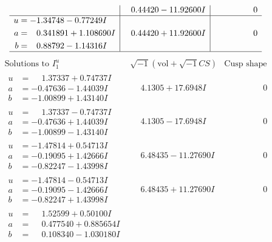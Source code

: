 \documentclass[1p]{elsarticle_modified}
\theoremstyle{definition}
\newcommand{\I}{\sqrt{-1}}
\begin{document}
$$\begin{array}{c|c|c}
 & \phantom{-}0.44420 - 11.92600 I & \phantom{-0.000000 } 0 \\ \hline\begin{aligned}
u &= -1.34748 - 0.77249 I \\
a &= \phantom{-}0.341891 + 1.108690 I \\
b &= \phantom{-}0.88792 - 1.14316 I\end{aligned}
 & \phantom{-}0.44420 + 11.92600 I & \phantom{-0.000000 } 0\\
 \hline 
 \end{array}$$\newpage$$\begin{array}{c|c|c}  
\text{Solutions to }I^u_{1}& \I (\text{vol} + \sqrt{-1}CS) & \text{Cusp shape}\\
 \hline 
\begin{aligned}
u &= \phantom{-}1.37337 + 0.74737 I \\
a &= -0.47636 - 1.44039 I \\
b &= -1.00899 + 1.43140 I\end{aligned}
 & \phantom{-}4.1305 + 17.6948 I & \phantom{-0.000000 } 0 \\ \hline\begin{aligned}
u &= \phantom{-}1.37337 - 0.74737 I \\
a &= -0.47636 + 1.44039 I \\
b &= -1.00899 - 1.43140 I\end{aligned}
 & \phantom{-}4.1305 - 17.6948 I & \phantom{-0.000000 } 0 \\ \hline\begin{aligned}
u &= -1.47814 + 0.54713 I \\
a &= -0.19095 + 1.42666 I \\
b &= -0.82247 - 1.43998 I\end{aligned}
 & \phantom{-}6.48435 - 11.27690 I & \phantom{-0.000000 } 0 \\ \hline\begin{aligned}
u &= -1.47814 - 0.54713 I \\
a &= -0.19095 - 1.42666 I \\
b &= -0.82247 + 1.43998 I\end{aligned}
 & \phantom{-}6.48435 + 11.27690 I & \phantom{-0.000000 } 0 \\ \hline\begin{aligned}
u &= \phantom{-}1.52599 + 0.50100 I \\
a &= \phantom{-}0.477540 + 0.885654 I \\
b &= \phantom{-}0.108340 - 1.030180 I\end{aligned}

\end{array}$$
\end{document}
